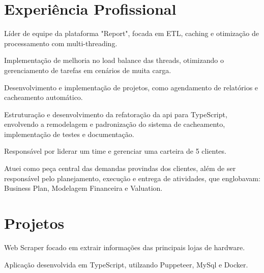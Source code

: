 \documentclass[]{deedy-resume-openfont}
\begin{document}
\begin{minipage}[t]{0.63\textwidth} 


\section{Experiência Profissional}
\vspace{\topsep} %
\begin{tightemize}
\item Líder de equipe da plataforma "Report", focada em ETL, caching e otimização de processamento com multi-threading.
\item Implementação de melhoria no load balance das threads, otimizando o gerenciamento de tarefas em cenários de muita carga.
\item Desenvolvimento e implementação de projetos, como agendamento de relatórios e cacheamento automático.
\item Estruturação e desenvolvimento da refatoração da api para TypeScript, envolvendo a remodelagem e padronização do sistema de cacheamento, implementação de testes e documentação.
\end{tightemize}
\sectionsep

\begin{tightemize}
\item Responsável por liderar um time e gerenciar uma carteira de 5 clientes.
\item Atuei como peça central das demandas provindas dos clientes, além de ser responsável pelo planejamento, execução e entrega de atividades, que englobavam: Business Plan, Modelagem Financeira e Valuation.
\end{tightemize}
\sectionsep



\section{Projetos} 

\begin{tightemize}
    \item Web Scraper focado em extrair informações das principais lojas de hardware.
    \item Aplicação desenvolvida em TypeScript, utilzando Puppeteer, MySql e Docker.
\end{tightemize}\sectionsep


\end{minipage}
\end{document}
